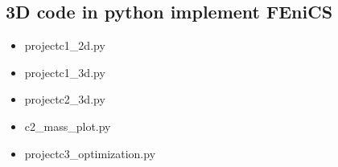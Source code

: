 \documentclass[12pt]{article}
\begin{document}
\subsection{3D code in python implement FEniCS}
\singlespacing
\begin{itemize}

\item{\large projectc1{\_}2d.py}

\vspace{1cm}

\item{\large projectc1{\_}3d.py}

\vspace{1cm}

\item{\large projectc2{\_}3d.py}

\vspace{1cm}

\item{\large c2{\_}mass{\_}plot.py}

\vspace{1cm}

\item{\large projectc3{\_}optimization.py}

\vspace{1cm}


\end{itemize}
\end{document}
